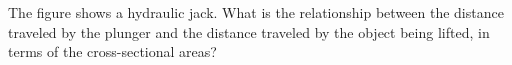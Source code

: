 The figure shows a hydraulic jack. What is the relationship between the
        distance traveled by the plunger and the distance traveled by
        the object being lifted, in terms of the cross-sectional areas?
